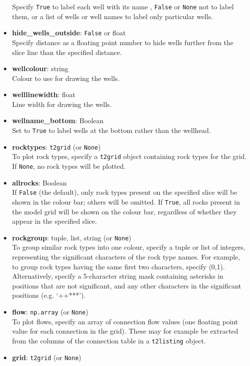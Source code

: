 \begin{itemize}
  Specify \texttt{True} to label each well with its name , \texttt{False} or \texttt{None} not to label them, or a list of wells or well names to label only particular wells.
\item \textbf{hide\_wells\_outside}: \texttt{False} or float\\
  Specify distance as a floating point number to hide wells further from the slice line than the specified distance.
\item \textbf{wellcolour}: string\\
  Colour to use for drawing the wells.
\item \textbf{welllinewidth}: float\\
  Line width for drawing the wells.
\item \textbf{wellname\_bottom}: Boolean\\
  Set to \texttt{True} to label wells at the bottom rather than the wellhead.
\item \textbf{rocktypes}: \texttt{t2grid} (or \texttt{None})\\
  To plot rock types, specify a \texttt{t2grid} object containing rock types for the grid.  If \texttt{None}, no rock types will be plotted.
\item \textbf{allrocks}: Boolean\\
  If \texttt{False} (the default), only rock types present on the specified slice will be shown in the colour bar; others will be omitted.  If \texttt{True}, all rocks present in the model grid will be shown on the colour bar, regardless of whether they appear in the specified slice.
\item \textbf{rockgroup}: tuple, list, string (or \texttt{None})\\
  To group similar rock types into one colour, specify a tuple or list of integers, representing the significant characters of the rock type names.  For example, to group rock types having the same first two characters, specify (0,1).  Alternatively, specify a 5-character string mask containing asterisks in positions that are not significant, and any other characters in the significant positions (e.g. `++***').
\item \textbf{flow}: \texttt{np.array} (or \texttt{None})\\
  To plot flows, specify an array of connection flow values (one floating point value for each connection in the grid).  These may for example be extracted from the columns of the connection table in a \texttt{t2listing} object.
\item \textbf{grid}: \texttt{t2grid} (or \texttt{None})\\

\end{itemize}
